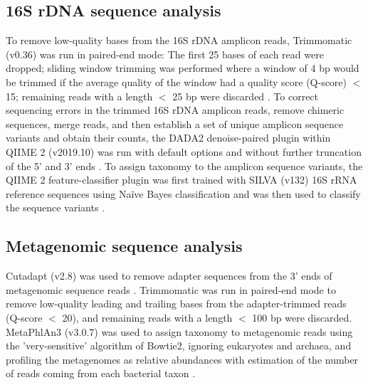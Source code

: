 \subsection{16S rDNA sequence analysis}

To remove low-quality bases from the 16S rDNA amplicon reads, Trimmomatic (v0.36) was run in paired-end mode:
The first 25 bases of each read were dropped; sliding window trimming was performed where a window of 4 bp would be trimmed if the average quality of the window had a quality score (Q-score) $<$ 15; remaining reads with a length $<$ 25 bp were discarded \parencite{Bolger.2014}.
To correct sequencing errors in the trimmed 16S rDNA amplicon reads, remove chimeric sequences, merge reads, and then establish a set of unique amplicon sequence variants and obtain their counts, the DADA2 denoise-paired plugin  within QIIME 2 (v2019.10) was run with default options and without further truncation of the 5’ and 3’ ends \parencite{Callahan.2016, Bolyen.2019}.
To assign taxonomy to the amplicon sequence variants, the QIIME 2 feature-classifier plugin was first trained with SILVA (v132) 16S rRNA reference sequences using Naïve Bayes classification and was then used to classify the sequence variants \parencite{Quast.2013, Bokulich.2018}.

\subsection{Metagenomic sequence analysis}

Cutadapt (v2.8) was used to remove adapter sequences from the 3’ ends of metagenomic sequence reads \parencite{Martin.2011}.
Trimmomatic was run in paired-end mode to remove low-quality leading and trailing bases from the adapter-trimmed reads (Q-score $<$ 20), and remaining reads with a length $<$ 100 bp were discarded.
MetaPhlAn3 (v3.0.7) was used to assign taxonomy to metagenomic reads using the 'very-sensitive' algorithm of Bowtie2, ignoring eukaryotes and archaea, and profiling the metagenomes as relative abundances with estimation of the number of reads coming from each bacterial taxon \parencite{Beghini.2020}.

